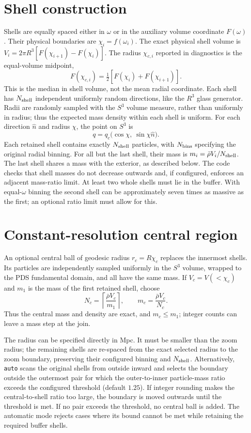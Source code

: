 \documentclass[11pt]{article}
\begin{document}
\section{Shell construction}
Shells are equally spaced either in \(\omega\) or in the auxiliary volume
coordinate \(F(\omega)\). Their physical boundaries are
\(\chi_i=f(\omega_i)\). The exact physical shell volume is
\(V_i=2\pi R^3[F(\chi_{i+1})-F(\chi_i)]\). The radius \(\chi_{c,i}\)
reported in diagnostics is the equal-volume midpoint,
\[
 F(\chi_{c,i})=\tfrac12[F(\chi_i)+F(\chi_{i+1})].
\]
This is the median in shell volume, not the mean radial coordinate.
Each shell has \(N_{\rm shell}\) independent uniformly random directions, like the
\(R^3\) glass generator. Radii are randomly sampled with the \(S^3\) volume
measure, rather than uniformly in radius; thus the expected mass density
within each shell is uniform. For each direction \(\hat n\) and radius \(\chi\),
the point on \(S^3\) is
\[
 q=q_c\bigl(\cos\chi,\ \sin\chi\hat n\bigr).
\]
Each retained shell contains exactly \(N_{\rm shell}\) particles, with
\(N_{\rm bins}\) specifying the original radial binning. For all but the last
shell, their mass is
\(m_i=\bar\rho V_i/N_{\rm shell}\). The last shell shares a mass with the
exterior, as described below. The code checks that shell masses do not
decrease outwards and, if configured, enforces an adjacent mass-ratio limit.
At least two whole shells must lie in the buffer. With equal-\(\omega\)
binning the second shell can be approximately seven times as massive as the
first; an optional ratio limit must allow for this.

\section{Constant-resolution central region}
An optional central ball of geodesic radius \(r_c=R\chi_c\) replaces the
innermost shells. Its particles are independently sampled uniformly in the
\(S^3\) volume, wrapped to the PDS fundamental domain, and all have the
same mass. If \(V_c=V(<\chi_c)\) and \(m_1\) is the mass of the first
retained shell, choose
\[
 N_c=\left\lceil\frac{\bar\rho V_c}{m_1}\right\rceil,\qquad
 m_c=\frac{\bar\rho V_c}{N_c}.
\]
Thus the central mass and density are exact, and \(m_c\le m_1\);
integer counts can leave a mass step at the join.

The radius can be specified directly in Mpc. It must be smaller than the zoom
radius; the remaining shells are re-spaced from the exact selected radius to
the zoom boundary, preserving their configured binning and \(N_{\rm shell}\).
Alternatively, \texttt{auto} scans the original shells from outside inward and
selects the boundary outside the outermost pair for which the outer-to-inner
particle-mass ratio exceeds the configured threshold (default \(1.25\)).
If integer rounding makes the central-to-shell ratio too large, the boundary
is moved outwards until the threshold is met. If no pair exceeds the threshold,
no central ball is added. The automatic mode rejects cases where its bound
cannot be met while retaining the required buffer shells.
\end{document}
